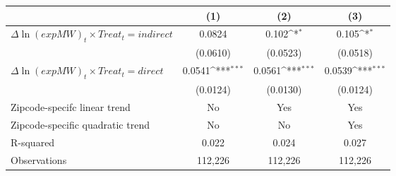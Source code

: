 {
\def\sym#1{\ifmmode^{#1}\else\(^{#1}\)\fi}
\begin{tabular}{l*{3}{c}}
\hline\hline
          &\multicolumn{1}{c}{(1)}         &\multicolumn{1}{c}{(2)}         &\multicolumn{1}{c}{(3)}         \\
\hline
$\Delta \ln(exp MW)_{t} \times Treat_{t}= indirect$&   0.0824         &    0.102\sym{*}  &    0.105\sym{*}  \\
          & (0.0610)         & (0.0523)         & (0.0518)         \\
[1em]
$\Delta \ln(exp MW)_{t} \times Treat_{t} = direct$&   0.0541\sym{***}&   0.0561\sym{***}&   0.0539\sym{***}\\
          & (0.0124)         & (0.0130)         & (0.0124)         \\
\hline
Zipcode-specifc linear trend&       No         &      Yes         &      Yes         \\
Zipcode-specific quadratic trend&       No         &       No         &      Yes         \\
R-squared &    0.022         &    0.024         &    0.027         \\
Observations&  112,226         &  112,226         &  112,226         \\
\hline\hline
\end{tabular}
}

